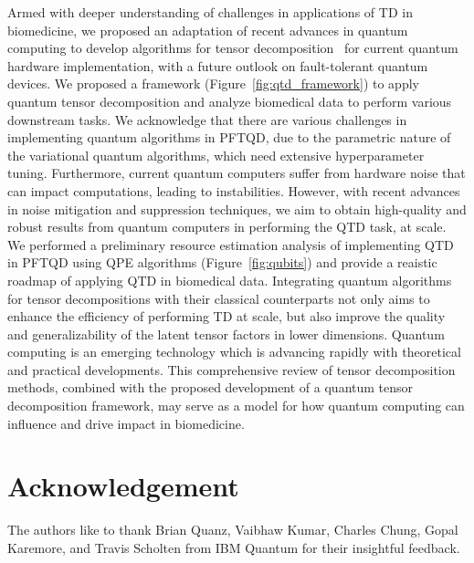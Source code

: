 Armed with deeper understanding of challenges in applications of TD in biomedicine, we proposed an adaptation of recent advances in quantum computing to develop algorithms for tensor decomposition~\cite{hastings2020classical,zhou2024statistical} for current quantum hardware implementation, with a future outlook on fault-tolerant quantum devices. We proposed a framework (Figure~\ref{fig:qtd_framework}) to apply quantum tensor decomposition and analyze biomedical data to perform various downstream tasks. We acknowledge that there are various challenges in implementing quantum algorithms in PFTQD, due to the parametric nature of the variational quantum algorithms, which need extensive hyperparameter tuning. Furthermore, current quantum computers suffer from hardware noise that can impact computations, leading to instabilities. However, with recent advances in noise mitigation and suppression techniques, we aim to obtain high-quality and robust results from quantum computers in performing the QTD task, at scale. We performed a preliminary resource estimation analysis of implementing QTD in PFTQD using QPE algorithms (Figure~\ref{fig:qubits}) and provide a reaistic roadmap of applying QTD in biomedical data. Integrating quantum algorithms for tensor decompositions with their classical counterparts not only aims to enhance the efficiency of performing TD at scale, but also improve the quality and generalizability of the latent tensor factors in lower dimensions. Quantum computing is an emerging technology which is advancing rapidly with theoretical and practical developments. This comprehensive review of tensor decomposition methods, combined with the proposed development of a quantum tensor decomposition framework, may serve as a model for how quantum computing can influence and drive impact in biomedicine. 

\section*{Acknowledgement}
The authors like to thank Brian Quanz, Vaibhaw Kumar, Charles Chung, Gopal Karemore, and Travis Scholten from IBM Quantum for their insightful feedback.

